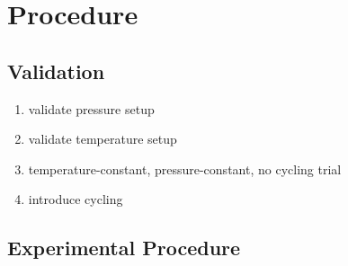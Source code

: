 \section{Procedure}
\subsection{Validation}
\begin{enumerate}
    \item validate pressure setup
    \item validate temperature setup
    \item temperature-constant, pressure-constant, no cycling trial
    \item introduce cycling
\end{enumerate}

\subsection{Experimental Procedure}
